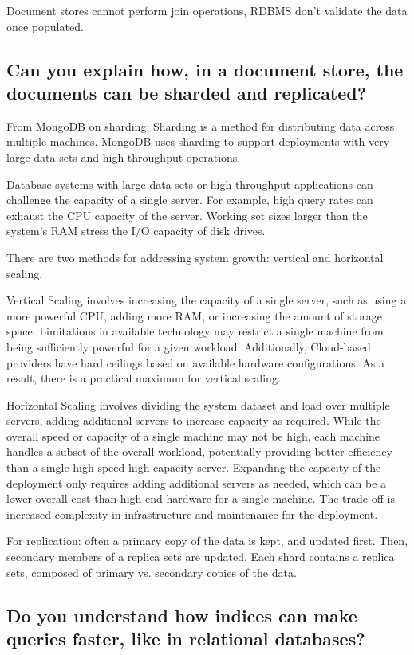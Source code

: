 \documentclass{article}
\begin{document}
Document stores cannot perform join operations, RDBMS don't validate the data once populated.

\subsection{Can you explain how, in a document store, the documents can be sharded and replicated?}

From MongoDB on sharding:
Sharding is a method for distributing data across multiple machines. MongoDB uses sharding to support deployments with very large data sets and high throughput operations.

Database systems with large data sets or high throughput applications can challenge the capacity of a single server. For example, high query rates can exhaust the CPU capacity of the server. Working set sizes larger than the system’s RAM stress the I/O capacity of disk drives.

There are two methods for addressing system growth: vertical and horizontal scaling.

Vertical Scaling involves increasing the capacity of a single server, such as using a more powerful CPU, adding more RAM, or increasing the amount of storage space. Limitations in available technology may restrict a single machine from being sufficiently powerful for a given workload. Additionally, Cloud-based providers have hard ceilings based on available hardware configurations. As a result, there is a practical maximum for vertical scaling.

Horizontal Scaling involves dividing the system dataset and load over multiple servers, adding additional servers to increase capacity as required. While the overall speed or capacity of a single machine may not be high, each machine handles a subset of the overall workload, potentially providing better efficiency than a single high-speed high-capacity server. Expanding the capacity of the deployment only requires adding additional servers as needed, which can be a lower overall cost than high-end hardware for a single machine. The trade off is increased complexity in infrastructure and maintenance for the deployment.

For replication: often a primary copy of the data is kept, and updated first. Then, secondary members of a replica sets are updated. Each shard contains a replica sets, composed of primary vs. secondary copies of the data.


\subsection{Do you understand how indices can make queries faster, like in relational databases?}
\end{document}
